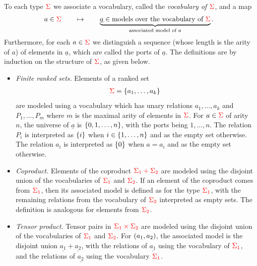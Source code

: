 \begin{definition} \label{def:type-model} To each type  ${\color{red}{\Sigma}}$ we associate a vocabulary, called the \emph{vocabulary of ${\color{red}{\Sigma}}$}, and a map 
    \begin{align*}
        a \in {\color{red}{\Sigma}} \qquad \mapsto \qquad \underbrace{\underline a \in \text{models over the  vocabulary of  ${\color{red}{\Sigma}}$}}_{\text{associated model of $a$}}.
    \end{align*}
    Furthermore, for each $a \in {\color{red}{\Sigma}}$ we  distinguish a  sequence (whose length is the arity of $a$) of elements in $\underline a$, which are called the ports of $\underline a$.   The definitions are by induction on the structure of ${\color{red}{\Sigma}}$, as given below.
    \begin{itemize}
        \item \emph{Finite ranked sets.} Elements of a ranked set   \begin{align*}
        {\color{red}{\Sigma}} =  \{a_1,\ldots,a_k\}
        \end{align*} are modeled  using a vocabulary which has unary relations $a_1,\ldots,a_k$ and $P_1,\ldots,P_m$ where $m$ is the maximal arity of elements in ${\color{red}{\Sigma}}$. 
        For $a \in {\color{red}{\Sigma}}$ of arity $n$, the  universe of $\underline a$ is $\{0,1,\ldots,n\}$, with the ports being $1,\ldots,n$. 
            The  relation $P_i$  is interpreted as $\{i\}$ when $i \in \{1,\ldots,n\}$ and as the empty set otherwise. The relation $a_i$ is interpreted as $\{0\}$ when $a = a_i$ and as the empty set otherwise. 
        \item \emph{Coproduct.}  Elements of the coproduct ${\color{red}{\Sigma_1 + \Sigma_2}}$ are modeled using the disjoint union of the vocabularies of ${\color{red}{\Sigma_1}}$ and ${\color{red}{\Sigma_2}}$. 
            If an element of the coproduct comes from ${\color{red}{\Sigma_1}}$, then its associated model is defined as for the type ${\color{red}{\Sigma_1}}$, with  the remaining relations from the vocabulary of   ${\color{red}{\Sigma_2}}$ interpreted   as empty sets. The definition is analogous for  elements from ${\color{red}{\Sigma_2}}$. 
        \item \emph{Tensor product.}   Tensor pairs in   ${\color{red}{\Sigma_1 \times\Sigma_2}}$ are modeled
        using the disjoint union of the vocabularies of ${\color{red}{\Sigma_1}}$ and ${\color{red}{\Sigma_2}}$. 
            For  $(a_1,a_2)$, the associated model is    the disjoint union $\underline{a_1} + \underline {a_2}$, with the relations of $\underline {a_1}$ using the  vocabulary of ${{\color{red}{\Sigma_1}}}$, and the relations of $\underline {a_2}$ using the vocabulary  ${{\color{red}{\Sigma_1}}}$. 

\end{itemize}
\end{definition}

